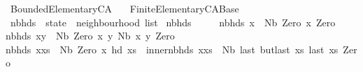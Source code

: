 %
\begin{isabellebody}%
%
%
\isadelimdocument
%
\endisadelimdocument
%
\isatagdocument
%
\isamarkuptrue%
%
\endisatagdocument
{\isafolddocument}%
%
\isadelimdocument
%
\endisadelimdocument
%
\isadelimtheory
%
\endisadelimtheory
%
\isatagtheory
{}\isamarkupfalse%
\ Bounded{\isacharunderscore}Elementary{\isacharunderscore}CA\isanewline
\ \ \ Finite{\isacharunderscore}Elementary{\isacharunderscore}CA{\isacharunderscore}Base\isanewline
{}%
\endisatagtheory
{\isafoldtheory}%
%
\isadelimtheory
%
\endisadelimtheory
%
\isadelimdocument
%
\endisadelimdocument
%
\isatagdocument
%
\isamarkuptrue%
%
\endisatagdocument
{\isafolddocument}%
%
\isadelimdocument
%
\endisadelimdocument
{}\isamarkupfalse%
\ nbhds\ {\isacharcolon}{\isacharcolon}\ {\isachardoublequoteopen}state\ {\isasymRightarrow}\ neighbourhood\ list{\isachardoublequoteclose}\ \isanewline
{\isachardoublequoteopen}nbhds\ {\isacharbrackleft}{\isacharbrackright}\ {\isacharequal}\ {\isacharbrackleft}{\isacharbrackright}{\isachardoublequoteclose}\ {\isacharbar}\ \isanewline
{\isachardoublequoteopen}nbhds\ {\isacharparenleft}x{\isacharhash}{\isacharbrackleft}{\isacharbrackright}{\isacharparenright}\ {\isacharequal}\ {\isacharbrackleft}{\isacharparenleft}Nb\ Zero\ x\ Zero{\isacharparenright}{\isacharbrackright}{\isachardoublequoteclose}\ {\isacharbar}\isanewline
{\isachardoublequoteopen}nbhds\ {\isacharparenleft}x{\isacharhash}y{\isacharhash}{\isacharbrackleft}{\isacharbrackright}{\isacharparenright}\ {\isacharequal}\ {\isacharbrackleft}{\isacharparenleft}Nb\ Zero\ x\ y{\isacharparenright}{\isacharcomma}\ {\isacharparenleft}Nb\ x\ y\ Zero{\isacharparenright}{\isacharbrackright}{\isachardoublequoteclose}\ {\isacharbar}\isanewline
{\isachardoublequoteopen}nbhds\ {\isacharparenleft}x{\isacharhash}xs{\isacharparenright}\ {\isacharequal}\ {\isacharparenleft}{\isacharparenleft}Nb\ Zero\ x\ {\isacharparenleft}hd\ xs{\isacharparenright}{\isacharparenright}\ {\isacharhash}\ {\isacharparenleft}inner{\isacharunderscore}nbhds\ {\isacharparenleft}x{\isacharhash}xs{\isacharparenright}{\isacharparenright}{\isacharparenright}\ {\isacharat}\ {\isacharbrackleft}Nb\ {\isacharparenleft}last\ {\isacharparenleft}butlast\ xs{\isacharparenright}{\isacharparenright}\ {\isacharparenleft}last\ xs{\isacharparenright}\ Zero{\isacharbrackright}{\isachardoublequoteclose}\isanewline

\end{isabellebody}
